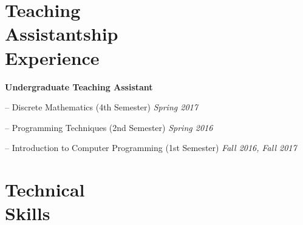 \documentclass[margin, 10pt]{res}
\begin{document}
\begin{resume}
\section{Teaching \\ Assistantship \\ Experience} 
\textbf{Undergraduate Teaching Assistant}
\begin{compactitem}
    \item[--] Discrete Mathematics (4th Semester) \hfill \emph{Spring 2017}
    \item[--] Programming Techniques (2nd Semester) \hfill \emph{Spring 2016}
    \item[--] Introduction to Computer Programming (1st Semester) \hfill \emph{Fall 2016, Fall 2017}
\end{compactitem}





\begin{comment}
\section{Data \\ Analysis \& \\ Visualization \\ Tools} 
\begin{compactitem}
\item[--] Python 
\item[--] Bash 
\item[--] MATLAB 
\item[--] GNU Octave 
\item[--] R
\item[--] Matplotlib 
\item[--] GNUPlot 
\item[--] Pandas
\item[--] Seaborn
\item[--] MySQL 
\item[--] MongoDB 
\end{compactitem}
\end{comment}

\section{Technical \\ Skills}


\end{resume}
\end{document}
